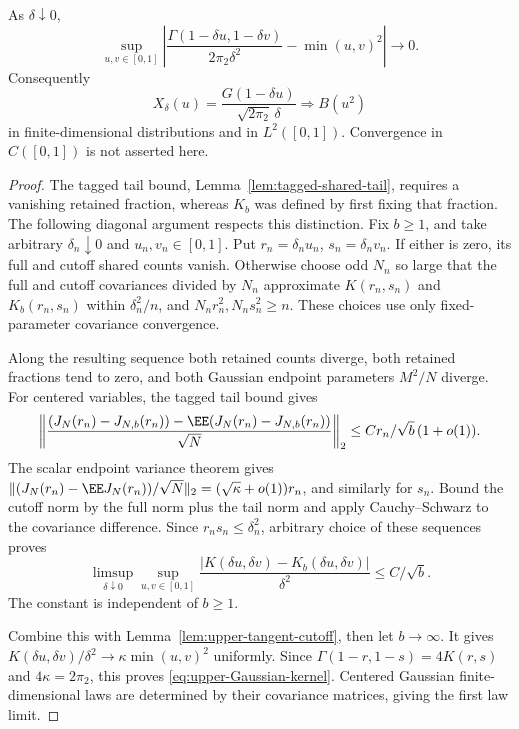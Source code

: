 \documentclass[11pt,letterpaper]{article}
\begin{document}
\begin{theorem}
\label{thm:upper-Gaussian-tangent}
As $\delta\downarrow0$,
\begin{equation}\label{eq:upper-Gaussian-kernel}
 \sup_{u,v\in[0,1]}
 \left|
 \frac{\Gamma(1-\delta u,1-\delta v)}{2\pi_2\delta^2}
                         -\min(u,v)^2\right|\longrightarrow0.
\end{equation}
Consequently
\[
 X_\delta(u)=\frac{G(1-\delta u)}{\sqrt{2\pi_2}\,\delta}
       \Longrightarrow B(u^2)
\]
in finite-dimensional distributions and in $L^2([0,1])$.
Convergence in $C([0,1])$ is not asserted here.
\end{theorem}
\begin{proof}
The tagged tail bound, Lemma~\ref{lem:tagged-shared-tail},
requires a vanishing retained fraction, whereas $K_b$ was
defined by first fixing that fraction.
The following diagonal argument respects this distinction.
Fix $b\ge1$, and take arbitrary $\delta_n\downarrow0$
and $u_n,v_n\in[0,1]$. Put
$r_n=\delta_nu_n$, $s_n=\delta_nv_n$.
If either is zero, its full and cutoff shared counts vanish.
Otherwise choose odd $N_n$ so large that the full and
cutoff covariances divided by $N_n$ approximate
$K(r_n,s_n)$ and $K_b(r_n,s_n)$ within $\delta_n^2/n$,
and $N_nr_n^2,N_ns_n^2\ge n$.
These choices use only fixed-parameter covariance convergence.

Along the resulting sequence both retained counts diverge,
both retained fractions tend to zero, and both
Gaussian endpoint parameters $M^2/N$ diverge.
For centered variables, the tagged tail bound gives
\[
 \left\|
 \frac{(J_N(r_n)-J_{N,b}(r_n))
             -\EE(J_N(r_n)-J_{N,b}(r_n))}{\sqrt N}
 \right\|_2
             \le C r_n/\sqrt b\,(1+o(1)).
\]
The scalar endpoint variance theorem gives
$\|(J_N(r_n)-\EE J_N(r_n))/\sqrt N\|_2
 =(\sqrt\kappa+o(1))r_n$, and similarly for $s_n$.
Bound the cutoff norm by the full norm plus the tail norm
and apply Cauchy--Schwarz to the covariance difference.
Since $r_ns_n\le\delta_n^2$, arbitrary choice of these
sequences proves
\begin{equation}\label{eq:upper-covariance-cutoff-removal}
 \limsup_{\delta\downarrow0}\sup_{u,v\in[0,1]}
 \frac{|K(\delta u,\delta v)-K_b(\delta u,\delta v)|}{\delta^2}
                         \le C/\sqrt b.
\end{equation}
The constant is independent of $b\ge1$.

Combine this with Lemma~\ref{lem:upper-tangent-cutoff},
then let $b\to\infty$.
It gives $K(\delta u,\delta v)/\delta^2\to
\kappa\min(u,v)^2$ uniformly.
Since $\Gamma(1-r,1-s)=4K(r,s)$ and $4\kappa=2\pi_2$,
this proves \eqref{eq:upper-Gaussian-kernel}.
Centered Gaussian finite-dimensional laws are determined
by their covariance matrices, giving the first law limit.


\end{proof}
\end{document}
